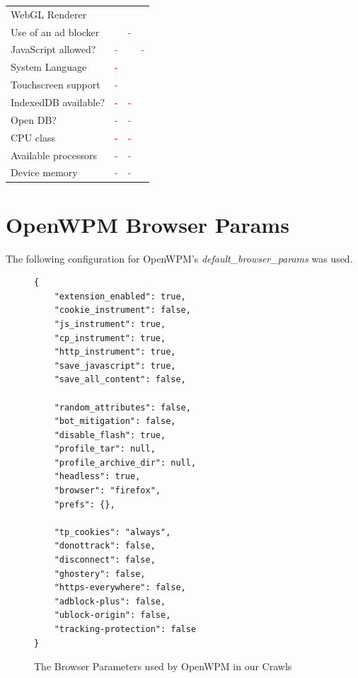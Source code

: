 \documentclass[
    fontsize=12pt,
    headings=small,
    parskip=half,
    bibliography=totoc,
    numbers=noenddot,
    open=any
    ]{scrreprt}
\newcommand{\cmark}{\textcolor{green}{\ding{51}}}
\newcommand{\xmark}{\textcolor{red}{-}}
\begin{document}
\begin{appendices}
\begin{table}
\begin{tabular}{ l c c c }
    WebGL Renderer & \cmark & \cmark & \cmark \\
    Use of an ad blocker & \cmark & \xmark & \cmark \\
    JavaScript allowed? & \xmark & \cmark & \xmark \\
    System Language & \xmark & \cmark & \cmark \\
    Touchscreen support & \xmark & \cmark & \cmark \\
    IndexedDB available? & \xmark & \xmark & \cmark \\
    Open DB? & \xmark & \xmark & \cmark \\
    CPU class & \xmark & \xmark & \cmark \\
    Available processors & \xmark & \xmark & \cmark \\
    Device memory & \xmark & \xmark & \cmark \\
    \bottomrule
\end{tabular}
\label{app:attribute_table}
\end{table}


\chapter{OpenWPM Browser Params}
The following configuration for OpenWPM's \textit{default\_browser\_params} was used.


\begin{figure}
\label{app:params}
\begin{verbatim}
{
    "extension_enabled": true,
    "cookie_instrument": false,
    "js_instrument": true,
    "cp_instrument": true,
    "http_instrument": true,
    "save_javascript": true,
    "save_all_content": false,

    "random_attributes": false,
    "bot_mitigation": false,
    "disable_flash": true,
    "profile_tar": null,
    "profile_archive_dir": null,
    "headless": true,
    "browser": "firefox",
    "prefs": {},

    "tp_cookies": "always",
    "donottrack": false,
    "disconnect": false,
    "ghostery": false,
    "https-everywhere": false,
    "adblock-plus": false,
    "ublock-origin": false,
    "tracking-protection": false
}
\end{verbatim}
\caption{The Browser Parameters used by OpenWPM in our Crawls}
\end{figure}

\end{appendices}

\clearpage

\printbibliography
\end{document}
